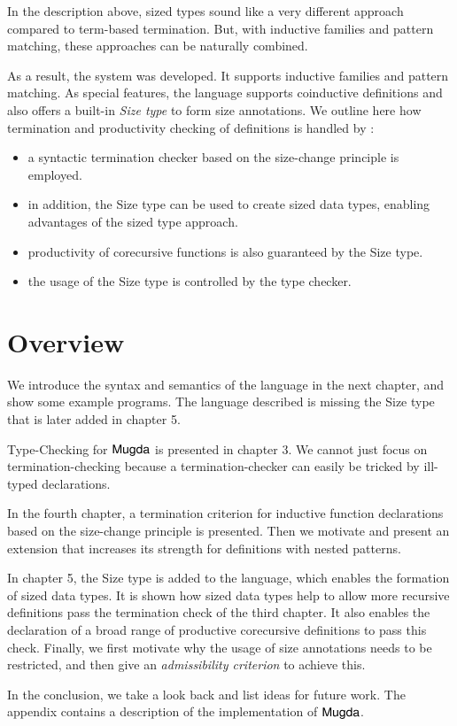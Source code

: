 In the description above, sized types sound like a very different approach compared to term-based termination.
But, with inductive families and pattern matching, these approaches can be naturally combined.

As a result, the system \mugda was developed.
It supports inductive families and pattern matching. 
As special features, the language supports coinductive definitions and also offers a built-in \emph{Size type} to form size annotations. 
We outline here how termination and productivity checking of definitions is handled by \mugda:
\begin{itemize}
\item
a syntactic termination checker based on the size-change principle is employed.
\item
in addition, the Size type can be used to create sized data types, enabling advantages of the 
sized type approach.
\item
productivity of corecursive functions is also guaranteed by the Size type.
\item
the usage of the Size type is controlled by the type checker.
\end{itemize}  
\section{Overview}
We introduce the syntax and semantics of the \mugda language in the next chapter, and show some example programs.
The language described is missing the Size type that is later added in chapter 5. 

Type-Checking for $\textsf{Mugda}$ is presented in chapter 3.
We cannot just focus on termination-checking because a termination-checker can easily be tricked by ill-typed declarations.

In the fourth chapter, a termination criterion for inductive function declarations based on the size-change principle is presented. Then we motivate and present an extension that increases its strength for definitions with nested patterns.

In chapter 5, the Size type is added to the language, which enables the formation of sized data types. It is shown how sized data types help to allow more recursive definitions pass the termination check of the third chapter.
It also enables the declaration of a broad range of productive corecursive definitions to pass this check.
Finally, we first motivate why the usage of size annotations needs to be restricted, and then give an \emph{admissibility criterion} to achieve this.

In the conclusion, we take a look back and list ideas for future work. The appendix contains a description of the implementation of $\textsf{Mugda}$.






